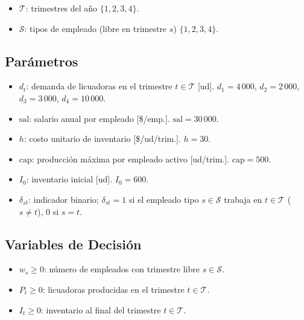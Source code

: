\documentclass[12pt,a4paper]{article}
\begin{document}
\begin{conjbox}
\begin{itemize}[leftmargin=1.5em]
  \item $\mathcal{T}$: trimestres del año $\{1, 2, 3, 4\}$.
  \item $\mathcal{S}$: tipos de empleado (libre en trimestre $s$) $\{1, 2, 3, 4\}$.
\end{itemize}
\end{conjbox}

\subsection{Parámetros}

\begin{parambox}
\begin{itemize}[leftmargin=1.5em]
  \item $d_t$: demanda de licuadoras en el trimestre $t \in \mathcal{T}$ [ud]. $d_1=4\,000$, $d_2=2\,000$, $d_3=3\,000$, $d_4=10\,000$.
  \item $\text{sal}$: salario anual por empleado [\$/emp.]. $\text{sal} = 30\,000$.
  \item $h$: costo unitario de inventario [\$/ud/trim.]. $h = 30$.
  \item $\text{cap}$: producción máxima por empleado activo [ud/trim.]. $\text{cap} = 500$.
  \item $I_0$: inventario inicial [ud]. $I_0 = 600$.
  \item $\delta_{st}$: indicador binario; $\delta_{st} = 1$ si el empleado tipo $s \in \mathcal{S}$ trabaja en $t \in \mathcal{T}$ ($s \neq t$), 0 si $s = t$.
\end{itemize}
\end{parambox}

\subsection{Variables de Decisión}

\begin{varbox}
\begin{itemize}[leftmargin=1.5em]
  \item $w_s \geq 0$: número de empleados con trimestre libre $s \in \mathcal{S}$.
  \item $P_t \geq 0$: licuadoras producidas en el trimestre $t \in \mathcal{T}$.
  \item $I_t \geq 0$: inventario al final del trimestre $t \in \mathcal{T}$.
\end{itemize}
\end{varbox}
\end{document}
